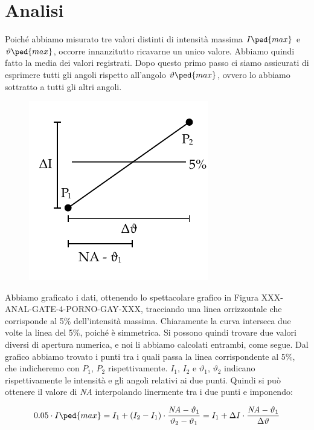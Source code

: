 \section{Analisi}

Poiché abbiamo misurato tre valori distinti di intensità massima $I\ped{max}$ e $\vartheta\ped{max}$, occorre innanzitutto ricavarne un unico valore. Abbiamo quindi fatto la media dei valori registrati. Dopo questo primo passo ci siamo assicurati di esprimere tutti gli angoli rispetto
all'angolo $\vartheta\ped{max}$, ovvero lo abbiamo sottratto a tutti gli altri angoli.

\begin{figure}
  \begin{center}
    \includegraphics{drawing.pdf}
  \end{center}
\end{figure}

Abbiamo graficato i dati, ottenendo lo spettacolare grafico in Figura XXX-ANAL-GATE-4-PORNO-GAY-XXX, tracciando una linea orrizzontale
che corrisponde al 5\% dell'intensità massima. Chiaramente la curva interseca due volte la linea del 5\%, poiché è simmetrica.
Si possono quindi trovare due valori diversi di apertura numerica, e noi li abbiamo calcolati entrambi, come segue.
Dal grafico abbiamo trovato i punti tra i quali passa la linea corrispondente al 5\%,
che indicheremo con $P_1$, $P_2$ rispettivamente. $I_1$, $I_2$ e $\vartheta_1$, $\vartheta_2$ indicano rispettivamente le intensità e gli angoli
relativi ai due punti. Quindi si può ottenere il valore di \emph{NA} interpolando linermente tra i due punti e imponendo:

\begin{equation}
        0.05 \cdot I\ped{max} = I_1 + (I_2 - I_1) \cdot \frac{\emph{NA} - \vartheta_1}{\vartheta_2 - \vartheta_1} \\
                              = I_1 + \Delta I \cdot \frac{\emph{NA} - \vartheta_1}{\Delta \vartheta}
\end{equation}

